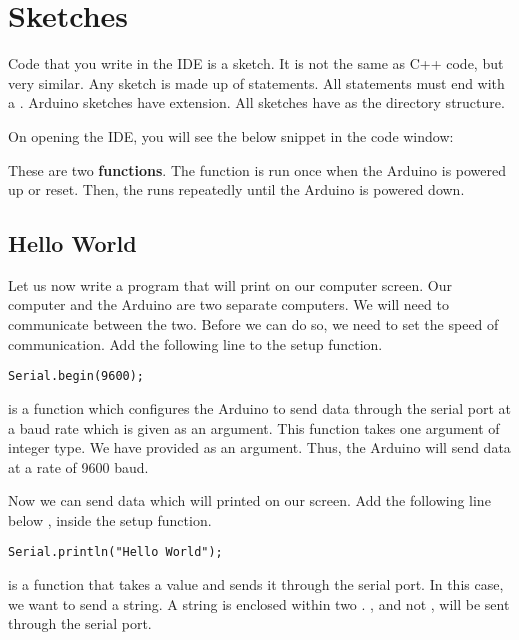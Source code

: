 \documentclass{article}
\begin{document}
\section{Sketches}

	Code that you write in the IDE is a sketch. It is not the same as C++ code, but very similar. Any sketch is made up of statements. All statements must end with a \inlncd{;}. Arduino sketches have  extension. All sketches have  as the directory structure.

	On opening the IDE, you will see the below snippet in the code window:

	

	These are two \textbf{functions}. The  function is run once when the Arduino is powered up or reset. Then, the  runs repeatedly until the Arduino is powered down.

	\subsection{Hello World}
		Let us now write a program that will print  on our computer screen. Our computer and the Arduino are two separate computers. We will need to communicate between the two. Before we can do so, we need to set the speed of communication. Add the following line to the setup function.

		\begin{lstlisting}[gobble=8, firstnumber = 3]
		Serial.begin(9600);
		\end{lstlisting}

		 is a function which configures the Arduino to send data through the serial port at a baud rate which is given as an argument. This function takes one argument of integer type. We have provided  as an argument. Thus, the Arduino will send data at a rate of 9600 baud.

		Now we can send data which will printed on our screen. Add the following line below , inside the setup function.

		\begin{lstlisting}[gobble=8, firstnumber = 4]
		Serial.println("Hello World");
		\end{lstlisting}

		 is a function that takes a value and sends it through the serial port. In this case, we want to send a string. A string is enclosed within two . , and not , will be sent through the serial port.
\end{document}

